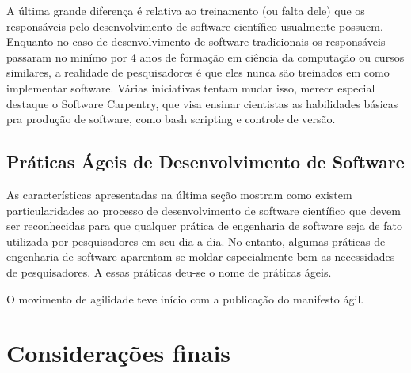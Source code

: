 \documentclass[
	article,			%
	11pt,				%
	oneside,			%
	a4paper,			%
	english,			%
	brazil,				%
	sumario=tradicional
	]{abntex2}
\begin{document}
A última grande diferença é relativa ao treinamento (ou falta dele) que os responsáveis pelo desenvolvimento de software científico usualmente possuem. Enquanto no caso de desenvolvimento de software tradicionais os responsáveis passaram no minímo por 4 anos de formação em ciência da computação ou cursos similares, a realidade de pesquisadores é que eles nunca são treinados em como implementar software. Várias iniciativas tentam mudar isso, merece especial destaque o Software Carpentry, que visa ensinar cientistas as habilidades básicas pra produção de software, como bash scripting e controle de versão.


\subsection{Práticas Ágeis de Desenvolvimento de Software}
As características apresentadas na última seção mostram como existem particularidades ao processo de desenvolvimento de software científico que devem ser reconhecidas para que qualquer prática de engenharia de software seja de fato utilizada por pesquisadores em seu dia a dia. No entanto, algumas práticas de engenharia de software aparentam se moldar especialmente bem as necessidades de pesquisadores. A essas práticas deu-se o nome de práticas ágeis.

O movimento de agilidade teve início com a publicação do manifesto ágil.


% 

\section*{Considerações finais}

\postextual



\emptythanks
\maketitle
\end{document}
